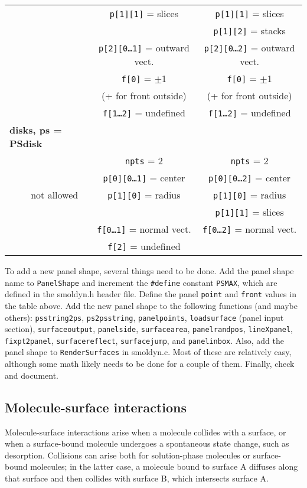 \documentclass {book}
\begin{document}
\begin{longtable}[c]{lccc}
&&\texttt{p[1][1]} = slices&\texttt{p[1][1]} = slices\\ 
&&&\texttt{p[1][2]} = stacks\\ 
&&\texttt{p[2][0\ldots1]} = outward vect.&\texttt{p[2][0\ldots2]} = outward vect.\\ 
&&\texttt{f[0]} = $\pm$1&\texttt{f[0]} = $\pm$1\\ 
&&(+ for front outside)&(+ for front outside)\\ 
&&\texttt{f[1\ldots2]} = undefined&\texttt{f[1\ldots2]} = undefined\\
\hline
\multicolumn{2}{l}{\textbf{disks, ps = PSdisk}}\\
&&\texttt{npts} = 2&\texttt{npts} = 2\\ 
&&\texttt{p[0][0\ldots1]} = center&\texttt{p[0][0\ldots2]} = center\\ 
&not allowed&\texttt{p[1][0]} = radius&\texttt{p[1][0]} = radius\\ 
&&&\texttt{p[1][1]} = slices\\ 
&&\texttt{f[0\ldots1]} = normal vect.&\texttt{f[0\ldots2]} = normal vect.\\ 
&&\texttt{f[2]} = undefined&\\

\end{longtable}

To add a new panel shape, several things need to be done.  Add the panel shape name to \texttt{PanelShape} and increment the \texttt{\#define} constant \texttt{PSMAX}, which are defined in the smoldyn.h header file.  Define the panel \texttt{point} and \texttt{front} values in the table above.  Add the new panel shape to the following functions (and maybe others): \texttt{psstring2ps}, \texttt{ps2psstring}, \texttt{panelpoints}, \texttt{loadsurface} (panel input section), \texttt{surfaceoutput}, \texttt{panelside}, \texttt{surfacearea}, \texttt{panelrandpos}, \texttt{lineXpanel}, \texttt{fixpt2panel}, \texttt{surfacereflect}, \texttt{surfacejump}, and \texttt{panelinbox}.  Also, add the panel shape to \texttt{RenderSurfaces} in smoldyn.c.  Most of these are relatively easy, although some math likely needs to be done for a couple of them.  Finally, check and document.

\subsection*{Molecule-surface interactions}

Molecule-surface interactions arise when a molecule collides with a surface, or when a surface-bound molecule undergoes a spontaneous state change, such as desorption.  Collisions can arise both for solution-phase molecules or surface-bound molecules; in the latter case, a molecule bound to surface A diffuses along that surface and then collides with surface B, which intersects surface A.
\end{document}
